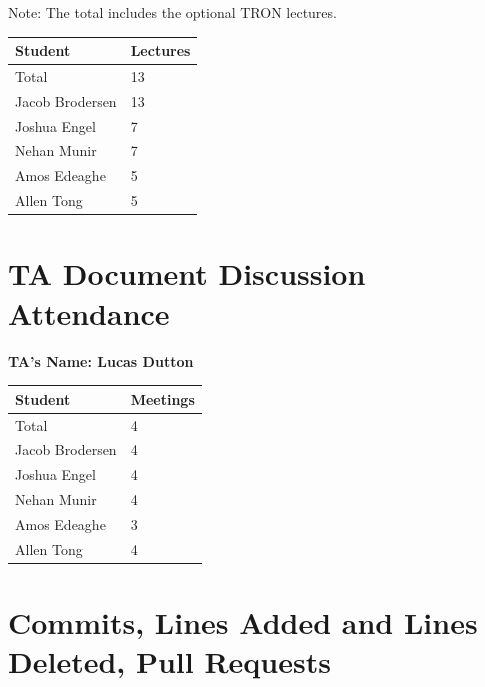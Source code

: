 \documentclass{article}
\begin{document}

Note: The total includes the optional TRON lectures.

\begin{table}[H]
\centering
\begin{tabular}{ll}
\toprule
\textbf{Student} & \textbf{Lectures}\\
\midrule
Total & 13\\
Jacob Brodersen & 13\\
Joshua Engel & 7\\
Nehan Munir & 7\\
Amos Edeaghe & 5\\
Allen Tong & 5\\
\bottomrule
\end{tabular}
\end{table}


\section{TA Document Discussion Attendance}


\noindent \textbf{TA's Name: Lucas Dutton}

\begin{table}[H]
\centering
\begin{tabular}{ll}
\toprule
\textbf{Student} & \textbf{Meetings}\\
\midrule
Total & 4\\
Jacob Brodersen & 4\\
Joshua Engel & 4\\
Nehan Munir & 4\\
Amos Edeaghe & 3\\
Allen Tong & 4\\
\bottomrule
\end{tabular}
\end{table}


\section{Commits, Lines Added and Lines Deleted, Pull Requests}
\end{document}
